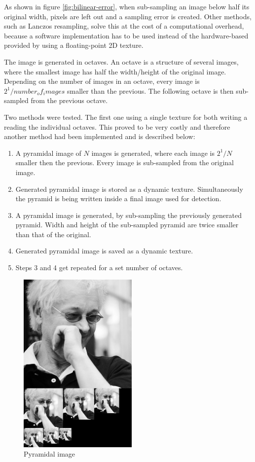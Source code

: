 As shown in figure \ref{fig:bilinear-error}, when sub-sampling an image below half its original width, pixels are left out and a sampling error is created. Other methods, such as Lanczos resampling, solve this at the cost of a computational overhead, because a software implementation has to be used instead of the hardware-based provided by using a floating-point 2D texture.

The image is generated in octaves. An octave is a structure of several images, where the smallest image has half the width/height of the original image. Depending on the number of images in an octave, every image is $2^1/number_of_images$ smaller than the previous. The following octave is then sub-sampled from the previous octave.

Two methods were tested. The first one using a single texture for both writing a reading the individual octaves. This proved to be very costly and therefore another method had been implemented and is described below:

\begin{enumerate}
	\item A pyramidal image of $N$ images is generated, where each image is $2^1/N$ smaller then the previous. Every image is sub-sampled from the original image.
	\item Generated pyramidal image is stored as a dynamic texture. Simultaneously the pyramid is being written inside a final image used for detection.
	\item A pyramidal image is generated, by sub-sampling the previously generated pyramid. Width and height of the sub-sampled pyramid are twice smaller than that of the original.
	\item Generated pyramidal image is saved as a dynamic texture.
	\item Steps 3 and 4 get repeated for a set number of octaves.
\end{enumerate}

\begin{center}
\begin{figure}[ht]
	\centering\includegraphics[height=9cm]{fig/pyramid.jpg}
	\caption{Pyramidal image}
\end{figure}
\end{center}

